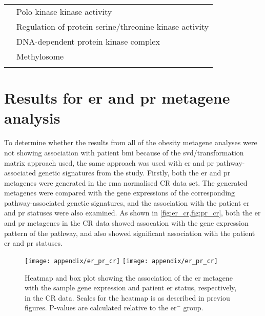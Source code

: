 \begin{appendices}
\begin{longtable}{lp{}}
									 & Polo kinase kinase activity                                                                     \\
									 & Regulation of protein serine/threonine kinase activity                                          \\
									 & DNA-dependent protein kinase complex                                                            \\
									 & Methylosome                                                                                     \\
		\hline
		\hline
		\insertTableNotes
	\end{longtable}

\section{Results for \gls{er} and \gls{pr} metagene analysis}
\label{sec:results_for_er_and_pr_metagene_analysis}

To determine whether the results from all of the obesity metagene analyses were not showing association with patient \gls{bmi} because of the \gls{svd}/transformation matrix approach used, the same approach was used with \gls{er} and \gls{pr} pathway-associated genetic signatures from the \citet{Gatza2010a} study.
Firstly, both the \gls{er} and \gls{pr} metagenes were generated in the \gls{rma} normalised CR data set.
The generated metagenes were compared with the gene expressions of the corresponding pathway-associated genetic signatures, and the association with the patient \gls{er} and \gls{pr} statuses were also examined.
As shown in \cref{fig:er_cr,fig:pr_cr}, both the \gls{er} and \gls{pr} metagenes in the CR data showed assocation with the gene expression pattern of the pathway, and also showed significant association with the patient \gls{er} and \gls{pr} statuses.

	\begin{figure}[htp!]
		\centering
		\texttt{[image: appendix/er\_pr\_cr]}
		\hfill
		\texttt{[image: appendix/er\_pr\_cr]}\\
		\caption[\acrshort{er} metagene in the CR data]{Heatmap and box plot showing the association of the \gls{er} metagene with the sample gene expression and patient \gls{er} status, respectively, in the CR data.
		Scales for the heatmap is as described in previou figures.
		P-values  are calculated relative to the \gls{er}$^-$ group.}
		\label{fig:er_cr}
	\end{figure}


\end{appendices}

